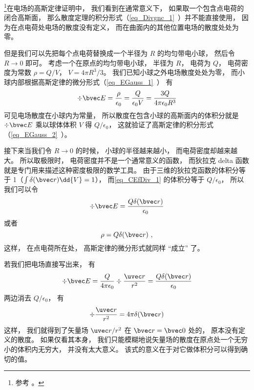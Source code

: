 

\footnote{参考 \cite{GriffE}。}在电场的高斯定律证明中， 我们看到在通常意义下， 如果取一个包含点电荷的闭合高斯面， 那么散度定理的积分形式（\autoref{eq_Divgnc_1}~）并不能直接使用， 因为在点电荷处电场的散度没有定义， 而在曲面内的其他位置电场的散度处处为零。

但是我们可以先把每个点电荷替换成一个半径为 $R$ 的均匀带电小球， 然后令 $R\to 0$ 即可。 考虑一个在原点的均匀带电小球， 半径为 $R$， 电荷为 $Q$， 电荷密度为常数 $\rho = Q/V$， $V = 4\pi R^3/3$。 我们已知小球之外电场散度处处为零， 而小球内部根据高斯定律的微分形式（\autoref{eq_EGauss_1}~） 有
\begin{equation}\label{eq_CEfDiv_1}
\div \bvec E = \frac{\rho}{\epsilon_0} = \frac{Q}{\epsilon_0 V} = \frac{3Q}{4\pi \epsilon_0 R^3}
\end{equation}
可见电场散度在小球内为常量， 所以散度在包含小球的高斯面内的体积分就是 $\div \bvec E$ 乘以球体体积 $V$ 得 $Q/\epsilon_0$， 这就验证了高斯定律的积分形式（\autoref{eq_EGauss_2}~）。

接下来当我们令 $R\to 0$ 的时候， 小球的半径越来越小， 而电荷密度却越来越大。 所以取极限时， 电荷密度并不是一个通常意义的函数， 而狄拉克 delta 函数就是专门用来描述这种密度极限的数学工具。 由于三维的狄拉克函数的体积分等于 1（$\int \delta(\bvec r)\dd{V} = 1$）， 而\autoref{eq_CEfDiv_1} 的体积分等于 $Q/\epsilon_0$， 所以我们可以令
\begin{equation}
\div \bvec E = \frac{Q\delta(\bvec r)}{\epsilon_0}
\end{equation}
或者
\begin{equation}
\rho = Q\delta(\bvec r)~,
\end{equation}
这样， 在点电荷所在处， 高斯定律的微分形式就同样 “成立” 了。

若我们把电场直接写出来， 有
\begin{equation}
\div \bvec E = \frac{Q}{4\pi\epsilon_0}\div \frac{\uvec r}{r^2} = \frac{Q\delta(\bvec r)}{\epsilon_0}
\end{equation}
两边消去 $Q/\epsilon_0$， 有
\begin{equation}\label{eq_CEfDiv_2}
\div \frac{\uvec r}{r^2} = 4\pi\delta(\bvec r)
\end{equation}
这样， 我们就得到了矢量场 ${\uvec r}/{r^2}$ 在 $\bvec r = \bvec 0$ 处的， 原本没有定义的散度。 如果仅看其本身， 我们只能模糊地说矢量场的散度在原点处一个无穷小的体积内无穷大， 并没有太大意义。 该式的意义在于对它做体积分可以得到确切的值。
